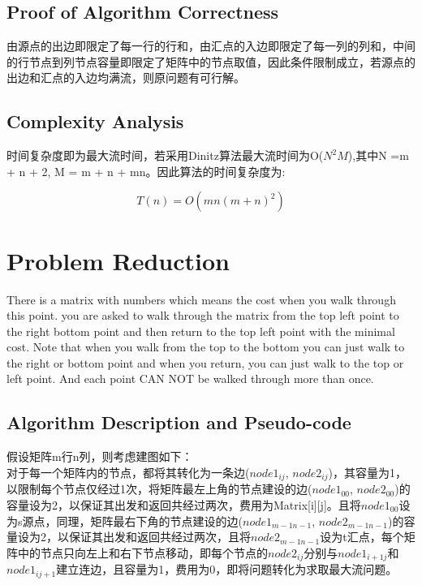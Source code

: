 \documentclass{article}
\begin{document}
\subsection{Proof of Algorithm Correctness}
由源点的出边即限定了每一行的行和，由汇点的入边即限定了每一列的列和，中间的行节点到列节点容量即限定了矩阵中的节点取值，因此条件限制成立，若源点的出边和汇点的入边均满流，则原问题有可行解。

\subsection{Complexity Analysis}
时间复杂度即为最大流时间，若采用Dinitz算法最大流时间为O($N^2M$),其中N =m + n + 2, M = m + n + mn。因此算法的时间复杂度为: 

\begin{equation}
T(n) = O(mn(m + n)^2)
\end{equation}

\newpage
\section{Problem Reduction}
There is a matrix with numbers which means the cost when you walk through this point. you are asked to walk through the matrix from the top left point to the right bottom point and then return to the top left point with the minimal cost. Note that when you walk from the top to the bottom you can just walk to the right or bottom point and when you return, you can just walk to the top or left point. And each point CAN NOT be walked through more than once.



\subsection{Algorithm Description and Pseudo-code}
假设矩阵m行n列，则考虑建图如下：\\

对于每一个矩阵内的节点，都将其转化为一条边($node1_{ij}$, $node2_{ij}$)，其容量为1，以限制每个节点仅经过1次，将矩阵最左上角的节点建设的边($node1_{00}$, $node2_{00}$)的容量设为2，以保证其出发和返回共经过两次，费用为Matrix[i][j]。且将$node1_{00}$设为s源点，同理，矩阵最右下角的节点建设的边($node1_{m-1n-1}$, $node2_{m-1n-1}$)的容量设为2，以保证其出发和返回共经过两次，且将$node2_{m-1n-1}$设为t汇点，每个矩阵中的节点只向左上和右下节点移动，即每个节点的$node2_{ij}$分别与$node1_{i+1j}$和$node1_{ij+1}$建立连边，且容量为1，费用为0，即将问题转化为求取最大流问题。
\end{document}
